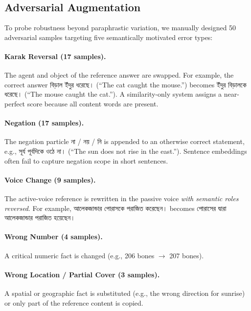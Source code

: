 \documentclass[11pt]{article}
\newcommand{\bn}[1]{{\bengalifont #1}}
\begin{document}
\subsection{Adversarial Augmentation}

To probe robustness beyond paraphrastic variation, we manually designed 50 adversarial samples targeting five semantically motivated error types:

\paragraph{Karak Reversal (17 samples).} The agent and object of the reference answer are swapped. For example, the correct answer \bn{বিড়াল ইঁদুর ধরেছে।} (``The cat caught the mouse.'') becomes \bn{ইঁদুর বিড়ালকে ধরেছে।} (``The mouse caught the cat.''). A similarity-only system assigns a near-perfect score because all content words are present.

\paragraph{Negation (17 samples).} The negation particle \bn{না / নয় / নি} is appended to an otherwise correct statement, e.g., \bn{সূর্য পূর্বদিকে ওঠে না।} (``The sun does not rise in the east.''). Sentence embeddings often fail to capture negation scope in short sentences.

\paragraph{Voice Change (9 samples).} The active-voice reference is rewritten in the passive voice \emph{with semantic roles reversed}. For example, \bn{আলেকজান্ডার পোরাসকে পরাজিত করেছেন।} becomes \bn{পোরাসের দ্বারা আলেকজান্ডার পরাজিত হয়েছেন।}

\paragraph{Wrong Number (4 samples).} A critical numeric fact is changed (e.g., 206 bones $\rightarrow$ 207 bones).

\paragraph{Wrong Location / Partial Cover (3 samples).} A spatial or geographic fact is substituted (e.g., the wrong direction for sunrise) or only part of the reference content is copied.
\end{document}
